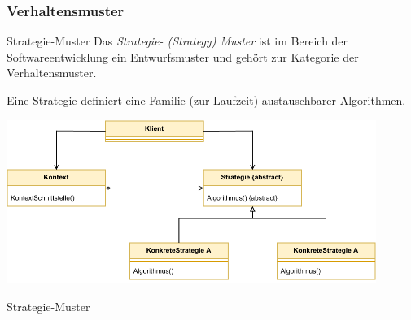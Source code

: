 \subsubsection{Verhaltensmuster}

\begin{defi}{Strategie-Muster}
    Das \emph{Strategie- (Strategy) Muster} ist im Bereich der Softwareentwicklung ein Entwurfsmuster und gehört zur Kategorie der Verhaltensmuster.

    Eine Strategie definiert eine Familie (zur Laufzeit) austauschbarer Algorithmen.

    \begin{center}
        \includegraphics[width=0.9\textwidth]{includes/figures/defi_strategie.pdf}
    \end{center}
\end{defi}

\begin{example}{Strategie-Muster}
    

    

    
\end{example}


